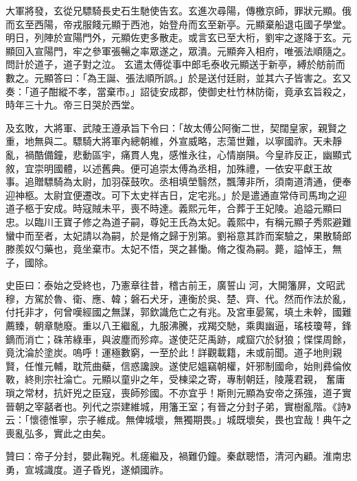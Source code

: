 \begin{pinyinscope}
 大軍將發，玄從兄驃騎長史石生馳使告玄。玄進次尋陽，傳檄京師，罪狀元顯。俄而玄至西陽，帝戎服餞元顯于西池，始登舟而玄至新亭。元顯棄船退屯國子學堂。明日，列陣於宣陽門外，元顯佐吏多散走。或言玄已至大桁，劉牢之遂降于玄。元顯回入宣陽門，牢之參軍張暢之率眾遂之，眾潰。元顯奔入相府，唯張法順隨之。問計於道子，道子對之泣。
 玄遣太傅從事中郎毛泰收元顯送于新亭，縛於舫前而數之。元顯答曰：「為王誕、張法順所誤。」於是送付廷尉，並其六子皆害之。玄又奏：「道子酣縱不孝，當棄市。」詔徒安成郡，使御史杜竹林防衛，竟承玄旨殺之，時年三十九。帝三日哭於西堂。



 及玄敗，大將軍、武陵王遵承旨下令曰：「故太傅公阿衡二世，契闊皇家，親賢之重，地無與二。驃騎大將軍內總朝維，外宣威略，志蕩世難，以寧國祚。天未靜亂，禍酷備鐘，悲動區宇，痛貫人鬼，感惟永往，心情崩隕。今皇祚反正，幽顯式敘，宜崇明國體，以述舊典。便可追崇太傅為丞相，加殊禮，一依安平獻王故
 事。追贈驃騎為太尉，加羽葆鼓吹。丞相填塋翳然，飄薄非所，須南道清通，便奉迎神柩。太尉宜便遷改。可下太史祥吉日，定宅兆。」於是遣通直常侍司馬珣之迎道子柩于安成。時寇賊未平，喪不時達。義熙元年，合葬于王妃陵。追謚元顯曰忠。以臨川王寶子修之為道子嗣，尊妃王氏為太妃。義熙中，有稱元顯子秀熙避難蠻中而至者，太妃請以為嗣，於是脩之歸于別第。劉裕意其詐而案驗之，果散騎郎滕羨奴勺藥也，竟坐棄市。太妃不悟，哭之甚慟。脩之復為嗣。薨，謚悼王，無子，國除。



 史臣曰：泰始之受終也，乃憲章往昔，稽古前王，廣誓山
 河，大開籓屏，文昭武穆，方駕於魯、衛、應、韓；磐石犬牙，連衡於吳、楚、齊、代。然而作法於亂，付托非才，何曾嘆經國之無謀，郭欽識危亡之有兆。及宮車晏駕，填土未幹，國難薦臻，朝章馳廢。重以八王繼亂，九服沸騰，戎羯交馳，乘輿幽逼，瑤枝瓊萼，鋒鏑而消亡；硃芾綠車，與波塵而殄瘁。遂使茫茫禹跡，咸窟穴於豺狼；惵惵周餘，竟沈淪於塗炭。嗚呼！運極數窮，一至於此！詳觀載籍，未或前聞。道子地則親賢，任惟元輔，耽荒曲蘗，信惑讒諛。遂使尼媼竊朝權，奸邪制國命，始則彞倫攸斁，終則宗社淪亡。元顯以童丱之年，受棟梁之寄，專制朝廷，陵蔑君親，
 奮庸瑣之常材，抗奸兇之臣寇，喪師殄國。不亦宜乎！斯則元顯為安帝之孫強，道子實晉朝之宰嚭者也。列代之崇建維城，用籓王室；有晉之分封子弟，實樹亂階。《詩》云：「懷德惟寧，宗子維成。無俾城壞，無獨期畏。」城既壞矣，畏也宜哉！典午之喪亂弘多，實此之由矣。



 贊曰：帝子分封，嬰此鞠兇。札瘥繼及，禍難仍鐘。秦獻聰悟，清河內顧。淮南忠勇，宣城識度。道子昏兇，遂傾國祚。



\end{pinyinscope}